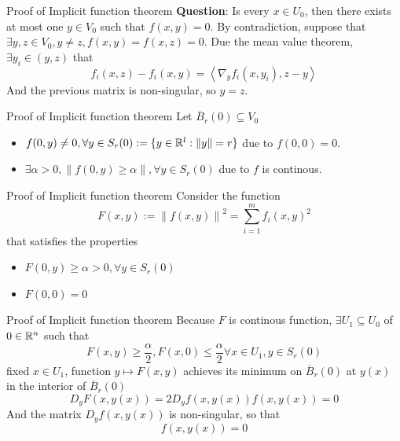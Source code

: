 \begin{frame}{Proof of Implicit function theorem}
    \textbf{Question}: Is every $x \in U_0$, then there exists at most one $y \in V_0$ such that $f(x, y) = 0$.
    \vspace{0.5cm}
    By contradiction, suppose that $\exists y, z \in V_0, y \ne z, f(x,y) = f(x,z) = 0$. Due the mean value theorem, $\exists y_i \in (y, z)$ that
    \begin{equation}
        f_i(x,z) - f_i(x,y) = \left \langle \nabla_yf_i(x,y_i), z -y \right \rangle
    \end{equation}
    And the previous matrix is non-singular, so $y = z$.
\end{frame}

\begin{frame}{Proof of Implicit function theorem}
    Let $\overline{B}_r(0) \subseteq V_0$
    \begin{itemize}
        \item $f(0, y) \ne 0, \forall y \in S_r(0) := \{y \in \mathbb{R}^l : \left \| y \right \| = r\}$ due to $f(0,0) = 0$.
        \item $\exists \alpha > 0, \left \| f(0, y) \geq \alpha \right \|, \forall y \in S_r(0)$ due to $f$ is continous.
    \end{itemize}
\end{frame}

\begin{frame}{Proof of Implicit function theorem}
    Consider the function 
    \begin{equation}
        F(x, y) := \left \| f(x, y) \right \|^2 = \sum_{i=1}^mf_i(x, y)^2
    \end{equation}
    that satisfies the properties 
    \begin{itemize}
        \item $F(0, y) \geq \alpha > 0, \forall y \in S_r(0)$
        \item $F(0, 0) = 0$
    \end{itemize}
\end{frame}

\begin{frame}{Proof of Implicit function theorem}
    Because $F$ is continous function, $\exists U_1 \subseteq U_0$ of $0 \in \mathbb{R}^n$ such that
    \begin{equation}
        F(x,y) \geq \frac{\alpha}{2}, F(x, 0) \leq \frac{\alpha}{2} \forall x \in U_1, y \in S_r(0)
    \end{equation}
    fixed $x \in U_1$, function $y \mapsto F(x, y)$ achieves its minimum on $\overline{B}_r(0)$ at $y(x)$ in the interior of $\overline{B}_r(0)$
    \begin{equation}
        D_yF(x,y(x)) = 2D_yf(x, y(x))f(x,y(x)) = 0
    \end{equation}
    And the matrix $D_yf(x, y(x))$ is non-singular, so that
    \begin{equation}
        f(x,y(x)) = 0
    \end{equation}
\end{frame}

